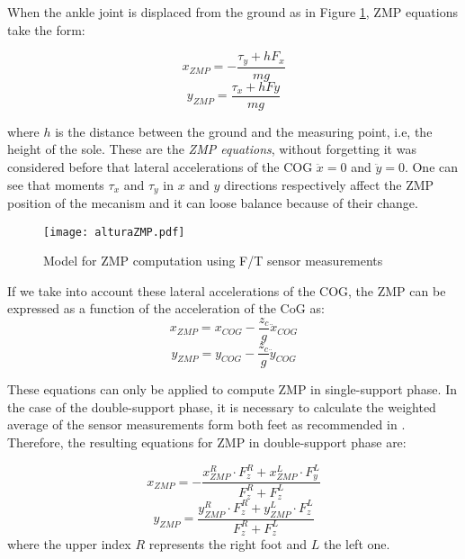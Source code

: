 When the ankle joint is displaced from the ground as in Figure \ref{fig:zmp_altura}, ZMP equations take the form:

\begin{equation}
x_{ZMP} = -\frac{\tau_y+hF_x}{mg}
\label{eq:xzmp}
\end{equation}
\begin{equation}
y_{ZMP} = \frac{\tau_x+hFy}{mg}
\label{eq:yzmp}
\end{equation}

where $h$ is the distance between the ground and the measuring point, i.e, the height of the sole. 
These are the \textit{ZMP equations}, without forgetting it was considered before that lateral accelerations of the COG $\ddot{x}=0$ and $\ddot{y}=0$. One can see that moments $\tau_x$ and $\tau_y$ in $x$ and $y$ directions respectively affect the ZMP position of the mecanism and it can loose balance because of their change.

\begin{figure}[!hbt]
\centering
\texttt{[image: alturaZMP.pdf]}
\caption{Model for ZMP computation using F/T sensor measurements}
\label{fig:zmp_altura}
\end{figure}

If we take into account these lateral accelerations of the COG, the ZMP can be expressed as a function of the acceleration of the CoG as:
\begin{equation}
x_{ZMP}=x_{COG}-\frac{z_c}{g}\ddot{x}_{COG}
\end{equation}
\begin{equation}
y_{ZMP}=y_{COG}-\frac{z_c}{g}\ddot{y}_{COG}
\end{equation}

These equations can only be applied to compute ZMP in single-support phase. In the case of the double-support phase, it is necessary to calculate the weighted average of the sensor measurements form both feet as recommended in \cite[pp. 82-83]{Kaj2005}. Therefore, the resulting equations for ZMP in double-support phase are:

\begin{equation}
x_{ZMP} = -\frac{x_{ZMP}^{R} \cdot F_{z}^{R} + x_{ZMP}^{L} \cdot F_{y}^{L}}{F_{z}^{R}+F_{z}^{L}}
\end{equation}
\begin{equation}
y_{ZMP} = \frac{y_{ZMP}^{R} \cdot F_{z}^{R} + y_{ZMP}^{L} \cdot F_{z}^{L}}{F_{z}^{R}+F_{z}^{L}}
\end{equation}
where the upper index $R$ represents the right foot and $L$ the left one.


